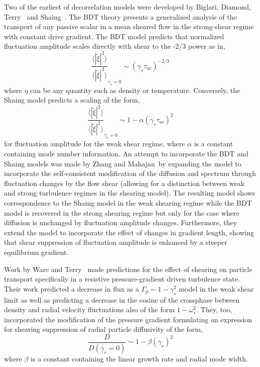 \documentclass[aip,pop,amsmath,amssymb,reprint,superscriptaddress]{revtex4-1} %
\begin{document}
Two of the earliest of decorrelation models were developed by Biglari, Diamond, Terry~\cite{biglari90} and Shaing~\cite{shaing90}. The BDT theory presents a generalized analysis of the transport of any passive scalar in a mean sheared flow in the strong-shear regime with constant drive gradient. The BDT model predicts that normalized fluctuation amplitude scales directly with shear to the -2/3 power as in,
%
\begin{equation}
\frac{\langle |\tilde{\xi}|^{2} \rangle}{\langle |\tilde{\xi}|^{2} \rangle}_{\gamma_{s}=0} \sim (\gamma_{s}\tau_{ac})^{-2/3}
\label{eq:BDT_theory}
\end{equation}
%
where $\eta$ can be any quantity such as density or temperature. Conversely, the Shaing model predicts a scaling of the form,
%
\begin{equation}
\frac{\langle |\tilde{\xi}|^{2} \rangle}{\langle |\tilde{\xi}|^{2} \rangle}_{\gamma_{s}=0} \sim 1- \alpha(\gamma_{s}\tau_{ac})^2
\label{eq:shaing_theory}
\end{equation}
%
for fluctuation amplitude for the weak shear regime, where $\alpha$ is a constant containing mode number information. An attempt to incorporate the BDT and Shaing models was made by Zhang and Mahajan~\cite{zhang92,zhang93}by expanding the model to incorporate the self-consistent modification of the diffusion and spectrum through fluctuation changes by the flow shear (allowing for a distinction between weak and strong turbulence regimes in the shearing model). The resulting model shows correspondence to the Shaing model in the weak shearing regime while the BDT model is recovered in the strong shearing regime but only for the case where diffusion is unchanged by fluctuation amplitude changes. Furthermore, they extend the model to incorporate the effect of changes in gradient length, showing that shear suppression of fluctuation amplitude is enhanced by a steeper equilibrium gradient. 

Work by Ware and Terry~\cite{ware96,ware98} made predictions for the effect of shearing on particle transport specifically in a resistive pressure-gradient driven turbulence state. Their work predicted a decrease in flux as a $\Gamma_{p} \sim 1-\gamma_{s}^2$ model in the weak shear limit as well as predicting a decrease in the cosine of the crossphase between density and radial velocity fluctuations also of the form $1-\omega_{s}^2$. They, too, incorporated the modification of the pressure gradient formulating an expression for shearing suppression of radial particle diffusivity of the form,
%
\begin{equation}
\frac{D}{D(\gamma_{s}=0)} \sim 1-\beta(\gamma_{s})^2
\label{eq:ware_diff_theory}
\end{equation}
%
where $\beta$ is a constant containing the linear growth rate and radial mode width.
\end{document}
